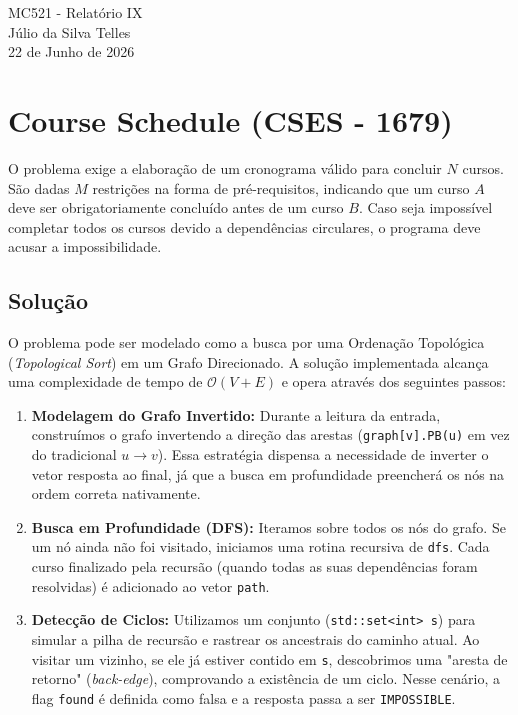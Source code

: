 \documentclass[12pt,a4paper]{article}
\begin{document}
\begin{center}
    {\LARGE MC521 - Relatório IX} \\ [2,5em]
    {\large Júlio da Silva Telles} \\ [1,0em]
    {\large 22 de Junho de 2026} \\ [1,5em]
\end{center}

\vspace{1cm} 

\section{Course Schedule (CSES - 1679)}
O problema exige a elaboração de um cronograma válido para concluir $N$ cursos. São dadas $M$ restrições na forma de pré-requisitos, indicando que um curso $A$ deve ser obrigatoriamente concluído antes de um curso $B$. Caso seja impossível completar todos os cursos devido a dependências circulares, o programa deve acusar a impossibilidade.

\subsection{Solução}
O problema pode ser modelado como a busca por uma Ordenação Topológica (\textit{Topological Sort}) em um Grafo Direcionado. A solução implementada alcança uma complexidade de tempo de $\mathcal{O}(V + E)$ e opera através dos seguintes passos:

\begin{enumerate}
    \item \textbf{Modelagem do Grafo Invertido:} Durante a leitura da entrada, construímos o grafo invertendo a direção das arestas (\texttt{graph[v].PB(u)} em vez do tradicional $u \to v$). Essa estratégia dispensa a necessidade de inverter o vetor resposta ao final, já que a busca em profundidade preencherá os nós na ordem correta nativamente.
    \item \textbf{Busca em Profundidade (DFS):} Iteramos sobre todos os nós do grafo. Se um nó ainda não foi visitado, iniciamos uma rotina recursiva de \texttt{dfs}. Cada curso finalizado pela recursão (quando todas as suas dependências foram resolvidas) é adicionado ao vetor \texttt{path}.
    \item \textbf{Detecção de Ciclos:} Utilizamos um conjunto (\texttt{std::set<int> s}) para simular a pilha de recursão e rastrear os ancestrais do caminho atual. Ao visitar um vizinho, se ele já estiver contido em \texttt{s}, descobrimos uma "aresta de retorno" (\textit{back-edge}), comprovando a existência de um ciclo. Nesse cenário, a flag \texttt{found} é definida como falsa e a resposta passa a ser \texttt{IMPOSSIBLE}.
\end{enumerate}
\end{document}
